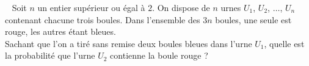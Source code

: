 \documentclass[11pt]{article}%
\begin{document}

\begin{exerciceSP}~
  Soit $n$ un entier supérieur ou égal à $2$. On dispose de $n$ urnes
  $U_1$, $U_2$, $\hdots$, $U_n$ contenant chacune trois boules. Dans
  l'ensemble des $3n$ boules, une seule est rouge, les autres étant
  bleues.\\
  Sachant que l'on a tiré sans remise deux boules bleues dans l'urne
  $U_1$, quelle est la probabilité que l'urne $U_2$ contienne la boule
  rouge ?
\end{exerciceSP}

\end{document}
